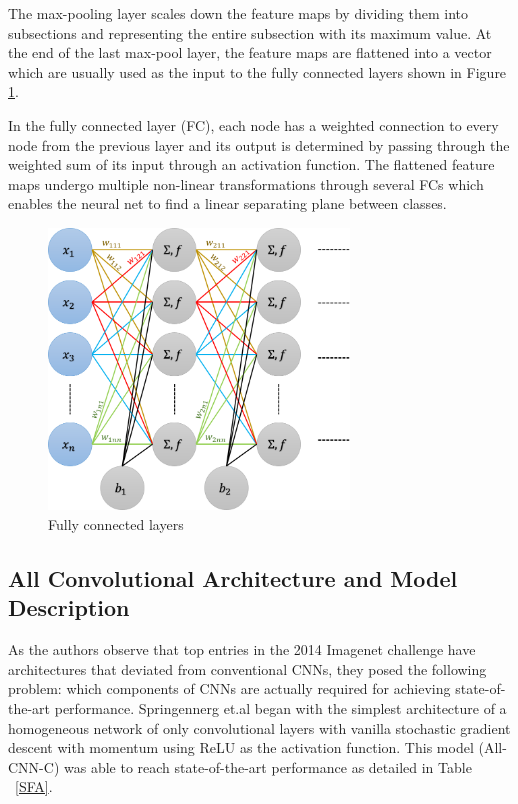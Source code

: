 The max-pooling layer scales down the feature maps by dividing them into subsections and representing the entire subsection with its maximum value. At the end of the last max-pool layer, the feature maps are flattened into a vector which are usually used as the input to the fully connected layers shown in Figure \ref{fig:fullyconnected}.

In the fully connected layer (FC), each node has a weighted connection to every node from the previous layer and its output is determined by passing through the weighted sum of its input through an activation function. The flattened feature maps undergo multiple non-linear transformations through several FCs which enables the neural net to find a linear separating plane between classes.\\

\begin{figure}[hb]
	\includegraphics[width = 8cm]{img/fullyconnected.png}
    \caption{\label{fig:fullyconnected}
    Fully connected layers}
\end{figure}

\subsection{All Convolutional Architecture and Model Description}
As the authors observe that top entries in the 2014 Imagenet challenge have architectures that deviated from conventional CNNs, they posed the following problem: which components of CNNs are actually required for achieving state-of-the-art performance. Springennerg et.al began with the simplest architecture of a homogeneous network of only convolutional layers with vanilla stochastic gradient descent with momentum using ReLU as the activation function. This model (All-CNN-C) was able to reach state-of-the-art performance as detailed in Table ~\ref{SFA}.

